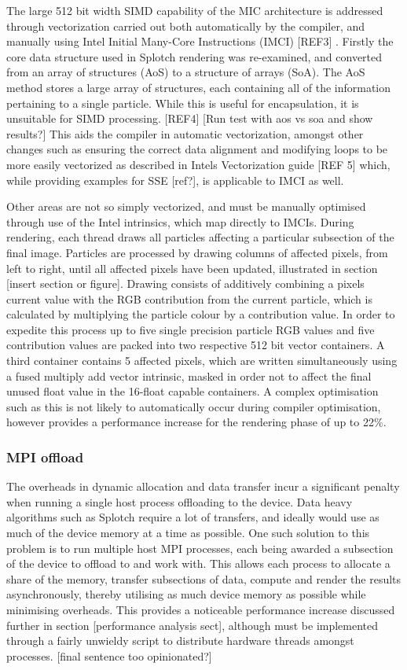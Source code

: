 \documentclass{easychair}
\begin{document}
The large 512 bit width SIMD capability of the MIC architecture is addressed through vectorization carried out both 
automatically by the compiler, and manually using Intel Initial Many-Core Instructions (IMCI) [REF3] . Firstly the 
core data structure used in Splotch rendering was re-examined, and converted from an array of structures (AoS) to 
a structure of arrays (SoA). The AoS method stores a large array of structures, each containing all of the 
information pertaining to a single particle. While this is useful for encapsulation, it is unsuitable for SIMD 
processing. [REF4] [Run test with aos vs soa and show results?] This aids the compiler in automatic vectorization, 
amongst other changes such as ensuring the correct data alignment and modifying loops to be more easily vectorized 
as described in Intels Vectorization guide [REF 5] which, while providing examples for SSE [ref?], is applicable 
to IMCI as well. 

Other areas are not so simply vectorized, and must be manually optimised through use of the Intel intrinsics, 
which map directly to IMCIs. During rendering, each thread draws all particles affecting a particular subsection 
of the final image. Particles are processed by drawing columns of affected pixels, from left to right, until all 
affected pixels have been updated, illustrated in section [insert section or figure]. Drawing consists of additively 
combining a pixels current value with the RGB contribution from the current particle, which is calculated by 
multiplying the particle colour by a contribution value. In order to expedite this process up to five single 
precision particle RGB values and five contribution values are packed into two respective 512 bit vector containers. 
A third container contains 5 affected pixels, which are written simultaneously using a fused multiply add vector 
intrinsic, masked in order not to affect the final unused float value in the 16-float capable containers. A 
complex optimisation such as this is not likely to automatically occur during compiler optimisation, however 
provides a performance increase for the rendering phase of up to 22\%.

\subsubsection{MPI offload}
\label{sect:mpioffload}
The overheads in dynamic allocation and data transfer incur a significant penalty when running a single host process 
offloading to the device. Data heavy algorithms such as Splotch require a lot of transfers, and ideally would use 
as much of the device memory at a time as possible. One such solution to this problem is to run multiple host MPI 
processes, each being awarded a subsection of the device to offload to and work with. This allows each process to 
allocate a share of the memory, transfer subsections of data, compute and render the results asynchronously, thereby 
utilising as much device memory as possible while minimising overheads. This provides a noticeable performance increase 
discussed further in section [performance analysis sect], although must be implemented through a fairly unwieldy script 
to distribute hardware threads amongst processes. [final sentence too opinionated?]
\end{document}
